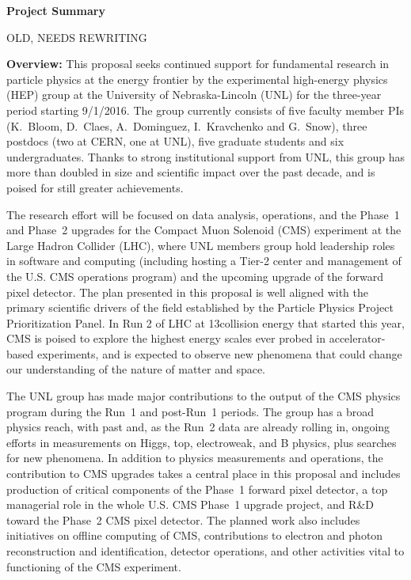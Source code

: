 \documentclass[11pt]{article}
\begin{document}
\begin{center}
{\large \bf Project Summary}\\
\end{center}

{\Huge\color{red} OLD, NEEDS REWRITING}

{\bf Overview:} This proposal seeks continued support for fundamental research in particle 
physics at the energy frontier by the experimental high-energy
physics (HEP) group at the University of Nebraska-Lincoln (UNL) for the
three-year period starting 9/1/2016.  The group currently consists of five
faculty member PIs (K.~Bloom, D.~Claes, A.~Dominguez, I.~Kravchenko and
G.~Snow), three postdocs (two at CERN, one at UNL), five graduate students 
and six undergraduates.  Thanks to strong institutional support from UNL, 
this group has more than doubled in size and scientific impact over the 
past decade, and is poised for still greater achievements.

 The research effort will be focused on data analysis, operations, 
and the Phase~1 and Phase~2 upgrades for the Compact Muon
Solenoid (CMS) experiment at the Large Hadron Collider (LHC),
where UNL members group hold leadership roles in software and
computing (including hosting a Tier-2 center and management of the U.S. CMS operations program) and the upcoming
upgrade of the forward pixel detector.  The plan presented in
this proposal is well aligned with the primary scientific drivers
of the field established by the Particle Physics Project
Prioritization Panel.  In Run 2 of LHC at
13\TeV collision energy that started this year, CMS is poised to explore the highest
energy scales ever probed in accelerator-based experiments, and
is expected to observe new phenomena that could change our
understanding of the nature of matter and space. 

The UNL group has made major contributions to the output of the
CMS physics program during the Run~1 and post-Run~1 periods. The
group has a broad physics reach, with past and, as the Run~2 data
are already rolling in, ongoing efforts in measurements on Higgs,
top, electroweak, and B physics, plus searches for new phenomena.
In addition to physics measurements and operations, the contribution to CMS upgrades 
takes a central place in this proposal and includes production of 
critical components of the Phase~1 forward pixel detector,
a top managerial role in the whole U.S. CMS Phase~1 upgrade project, and
R\&D toward the Phase~2 CMS pixel detector. The planned work also
includes initiatives on offline computing of CMS, contributions to
electron and photon reconstruction and identification, detector operations,
and other activities vital to functioning of the CMS experiment.
\end{document}
